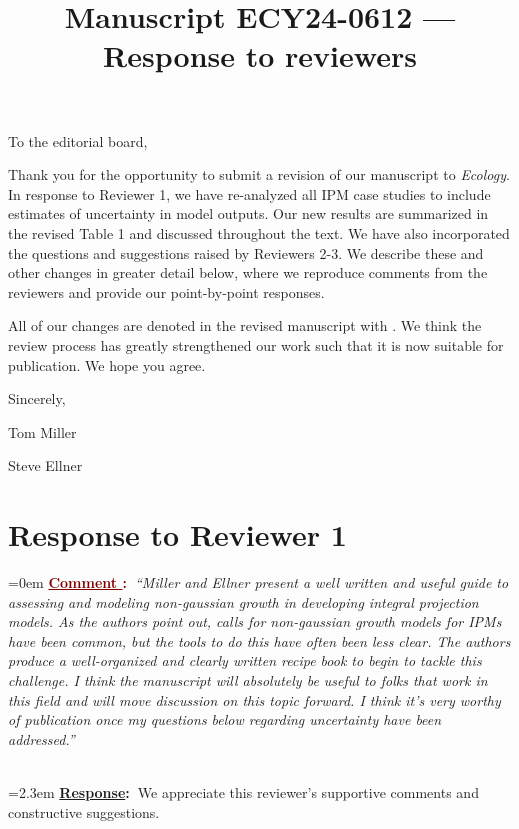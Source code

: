 \documentclass[12pt]{article}
\newcounter{cN}
\newcommand{\comment}[1]{
	\vspace{2em}
	\refstepcounter{cN} %
	\noindent \hangindent=0em \textbf{\textcolor{Maroon}{\uline{Comment \thecN}:~}}\emph{``#1''}
	}
\newcommand{\response}[1]{
	\\[0.25em]
	\hangindent=2.3em \textbf{\textcolor{NavyBlue}{\uline{Response}:~}}#1
	}
\newcommand{\revise}[1]{{\color{Mahogany}{#1}}}
\begin{document}
\title{Manuscript ECY24-0612 --- Response to reviewers}

\maketitle
\noindent To the editorial board,

Thank you for the opportunity to submit a revision of our manuscript to \emph{Ecology}. In response to Reviewer 1, we have re-analyzed all IPM case studies to include estimates of uncertainty in model outputs. Our new results are summarized in the revised Table 1 and discussed throughout the text. We have also incorporated the questions and suggestions raised by Reviewers 2-3. We describe these and other changes in greater detail below, where we reproduce comments from the reviewers and provide our point-by-point responses. 

All of our changes are denoted in the revised manuscript with \revise{Mahogany font}. 
We think the review process has greatly strengthened our work such that it is now suitable for publication.
We hope you agree. 

\vspace{2em}
Sincerely,

Tom Miller

Steve Ellner

\newpage

\section{Response to Reviewer 1}
\vspace{-2em}

\comment{Miller and Ellner present a well written and useful guide to assessing and modeling non-gaussian growth in developing integral projection models. As the authors point out, calls for non-gaussian growth models for IPMs have been common, but the tools to do this have often been less clear. The authors produce a well-organized and clearly written recipe book to begin to tackle this challenge. I think the manuscript will absolutely be useful to folks that work in this field and will move discussion on this topic forward. I think it’s very worthy of publication once my questions below regarding uncertainty have been addressed.}
\response{We appreciate this reviewer's supportive comments and constructive suggestions.}
\end{document}
